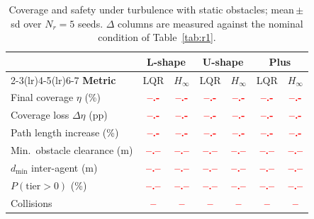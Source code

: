 \documentclass[10pt,letterpaper]{article}
\newcommand{\val}[1]{\textcolor{red}{\textbf{#1}}}
\begin{document}
\begin{table}[tbp]
    \centering
    \caption{Coverage and safety under turbulence with static obstacles; mean\,$\pm$\,sd over $N_r=5$ seeds.
        $\Delta$ columns are measured against the nominal condition of Table~\ref{tab:r1}.}
    \label{tab:r3}
    \begin{tabular}{lcccccc}
        \toprule
                                        & \multicolumn{2}{c}{\textbf{L-shape}} & \multicolumn{2}{c}{\textbf{U-shape}} & \multicolumn{2}{c}{\textbf{Plus}}                                           \\
        \cmidrule(lr){2-3}\cmidrule(lr){4-5}\cmidrule(lr){6-7}
        \textbf{Metric}                 & LQR                                  & $H_\infty$                           & LQR                               & $H_\infty$  & LQR         & $H_\infty$  \\
        \midrule
        Final coverage $\eta$ (\%)      & \val{--.-}                           & \val{--.-}                           & \val{--.-}                        & \val{--.-}  & \val{--.-}  & \val{--.-}  \\
        Coverage loss $\Delta\eta$ (pp) & \val{--.-}                           & \val{--.-}                           & \val{--.-}                        & \val{--.-}  & \val{--.-}  & \val{--.-}  \\
        Path length increase (\%)       & \val{--.-}                           & \val{--.-}                           & \val{--.-}                        & \val{--.-}  & \val{--.-}  & \val{--.-}  \\
        Min.\ obstacle clearance (m)    & \val{--.--}                          & \val{--.--}                          & \val{--.--}                       & \val{--.--} & \val{--.--} & \val{--.--} \\
        $d_{\min}$ inter-agent (m)      & \val{--.--}                          & \val{--.--}                          & \val{--.--}                       & \val{--.--} & \val{--.--} & \val{--.--} \\
        $P(\mathrm{tier}>0)$ (\%)       & \val{--.--}                          & \val{--.--}                          & \val{--.--}                       & \val{--.--} & \val{--.--} & \val{--.--} \\
        Collisions                      & \val{--}                             & \val{--}                             & \val{--}                          & \val{--}    & \val{--}    & \val{--}    \\
        \bottomrule
    \end{tabular}
\end{table}
\end{document}
